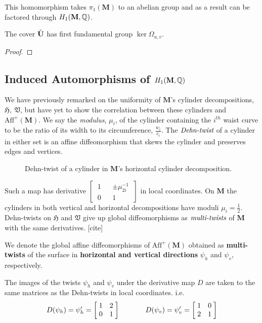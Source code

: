 \documentclass[]{article}
\def\bM{\mathbf{M}}
\begin{document}
This homomorphism takes $\pi_1(\bM)$ to an abelian group and as a result can be factored through $H_1(\bM,\QQ)$. 

\begin{thm}
The cover $\tilde{\mathbf{U}}$ has first fundamental group $\ker\Omega_{u,v}$.
\begin{proof}
\end{proof}
\end{thm}

\subsection{Induced Automorphisms of $H_1(\bM,\QQ)$}
We have previously remarked on the uniformity of $\bM$'s cylinder decompositions, $\mathfrak{H},~\mathfrak{V}$, but have yet to show the correlation between these cylinders and $\text{Aff}^+(\bM)$. We say the \emph{modulus}, $\mu_i$, of the cylinder containing the $i^{th}$ waist curve to be the ratio of its width to its circumference, $\frac{w_i}{c_i}$. The $\emph{Dehn-twist}$ of a cylinder in either set is an affine diffeomorphism that skews the cylinder and preserves edges and vertices.

\begin{figure}[H]
\centering

\label{fig:skew}
\caption{Dehn-twist of a cylinder in $\bM$'s horizontal cylinder decomposition.}
\end{figure}

Such a map has derivative $\left[~\begin{matrix}1 && \pm\mu_{2i}^{-1}\\0 && 1\end{matrix}~\right]$ in local coordinates. On $\bM$ the cylinders in both vertical and horizontal decompositions have moduli $\mu_i=\frac{1}{2}$. Dehn-twists on $\mathfrak{H}$ and $\mathfrak{V}$ give up global diffeomorphisms as $\emph{multi-twists}$ of $\bM$ with the same derivatives. [cite] 

\begin{Def}
We denote the global affine diffeomorphisms of $\text{Aff}^+(\bM)$ obtained as \textbf{multi-twists} of the surface in \textbf{horizontal and vertical directions} $\psi_h$ and $\psi_v$, respectively.
\end{Def}

The images of the twists $\psi_h$ and $\psi_v$ under the derivative map $D$ are taken to the same matrices as the Dehn-twists in local coordinates. i.e.
\begin{align*}
D(\psi_h)=\psi_h'=\left[ \hspace{1mm} \begin{matrix}
				1 &   2\\
				0 & 1
			\end{matrix}\hspace{1mm}\right] \hspace{0.5in}
			D(\psi_v)=\psi_v'=\left[ \hspace{1mm} \begin{matrix}
							1 & 0\\
							 2 & 1
						\end{matrix}\hspace{1mm}\right]
\end{align*}
\end{document}
